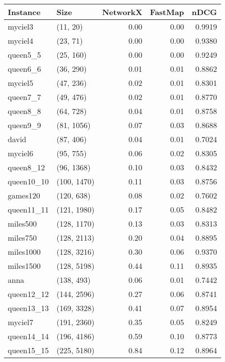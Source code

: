 \begin{tabular}{llrrr}
\toprule
  Instance &         Size &  NetworkX &  FastMap &   nDCG \\
\midrule
   myciel3 &     (11, 20) &      0.00 &     0.00 & 0.9919 \\
   myciel4 &     (23, 71) &      0.00 &     0.00 & 0.9380 \\
  queen5\_5 &    (25, 160) &      0.00 &     0.00 & 0.9249 \\
  queen6\_6 &    (36, 290) &      0.01 &     0.01 & 0.8862 \\
   myciel5 &    (47, 236) &      0.02 &     0.01 & 0.8301 \\
  queen7\_7 &    (49, 476) &      0.02 &     0.01 & 0.8770 \\
  queen8\_8 &    (64, 728) &      0.04 &     0.01 & 0.8758 \\
  queen9\_9 &   (81, 1056) &      0.07 &     0.03 & 0.8688 \\
     david &    (87, 406) &      0.04 &     0.01 & 0.7024 \\
   myciel6 &    (95, 755) &      0.06 &     0.02 & 0.8305 \\
 queen8\_12 &   (96, 1368) &      0.10 &     0.03 & 0.8432 \\
queen10\_10 &  (100, 1470) &      0.11 &     0.03 & 0.8756 \\
  games120 &   (120, 638) &      0.08 &     0.02 & 0.7602 \\
queen11\_11 &  (121, 1980) &      0.17 &     0.05 & 0.8482 \\
  miles500 &  (128, 1170) &      0.13 &     0.03 & 0.8313 \\
  miles750 &  (128, 2113) &      0.20 &     0.04 & 0.8895 \\
 miles1000 &  (128, 3216) &      0.30 &     0.06 & 0.9370 \\
 miles1500 &  (128, 5198) &      0.44 &     0.11 & 0.8935 \\
      anna &   (138, 493) &      0.06 &     0.01 & 0.7442 \\
queen12\_12 &  (144, 2596) &      0.27 &     0.06 & 0.8741 \\
queen13\_13 &  (169, 3328) &      0.41 &     0.07 & 0.8954 \\
   myciel7 &  (191, 2360) &      0.35 &     0.05 & 0.8249 \\
queen14\_14 &  (196, 4186) &      0.59 &     0.10 & 0.8773 \\
queen15\_15 &  (225, 5180) &      0.84 &     0.12 & 0.8964 \\

\end{tabular}
